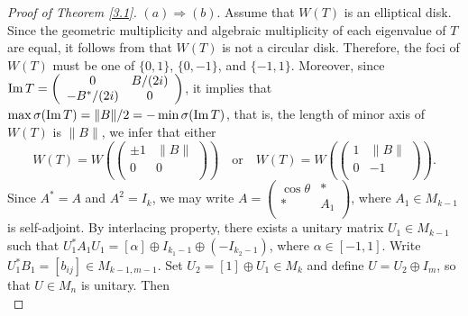 \documentclass[11pt]{article}
\numberwithin{equation}{section}
\def\im{{\rm Im\,}}
\begin{document}
\begin{proof}[Proof of Theorem \ref{3.1}]
$(a)\Rightarrow (b)$. Assume that $W(T)$ is an elliptical disk. Since the geometric multiplicity and algebraic multiplicity of each eigenvalue of $T$ are equal, it follows from \cite[Corollary 4]{W} that $W(T)$ is not a circular disk. Therefore, the foci of $W(T)$ must be one of
$\{0,1\}$, $\{0,-1\}$, and $\{-1,1\}$. Moreover, since
$\im T=\left(
                          \begin{array}{cc}
                            0 & B/(2i) \\
                            -B^*/(2i) & 0 \\
                          \end{array}
                        \right)
$, it implies that $\max \sigma (\im T)=\|B\|/2=-\min \sigma (\im T)$, that is, the length of minor axis
of $W(T)$ is $\|B\|$, we infer that either $$W(T)=W(\left(
                                                                 \begin{array}{cc}
                                                                   \pm 1 & \|B\| \\
                                                                   0 & 0 \\
                                                                 \end{array}
                                                               \right)
)\ \ \ \mbox{ or } \ \ \ W(T)= W(\left(
                \begin{array}{cc}
                  1 & \|B\| \\
                  0 & -1 \\
                \end{array}
              \right)
).$$
Since $A^*=A$ and $A^2=I_k$, we may write $A=\left(
                                                     \begin{array}{cc}
                                                       \cos\theta & * \\
                                                       * & A_1 \\
                                                     \end{array}
                                                   \right)
$, where $A_1\in M_{k-1}$ is self-adjoint. By interlacing property, there exists a unitary matrix $U_1\in M_{k-1}$ such that $U_1^*A_1U_1=[\alpha]\oplus I_{k_1-1}\oplus (-I_{k_2-1})$, where $\alpha\in [-1, 1]$. Write $U_1^*B_1=[b_{ij}]\in M_{k-1, m-1}$.
Set $U_2=[1]\oplus U_1\in M_k$ and define $U=U_2\oplus I_m$, so that $U\in M_{n}$ is unitary.  Then $$
$$
\end{proof}
\end{document}
